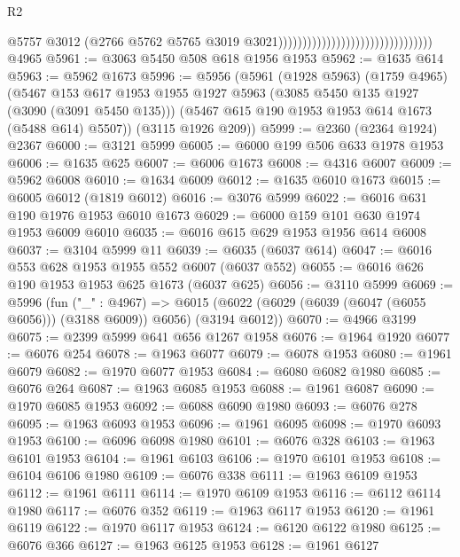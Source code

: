 \begin{lexlean}{R2}
\begin{coremodule}
                                                                  @5757
                                                                  @3012
                                                                  (@2766
                                                                    @5762
                                                                    @5765
                                                                    @3019
                                                                    @3021))))))))))))))))))))))))))))))))
    @4965
@5961 := @3063 @5450 @508 @618 @1956 @1953
@5962 := @1635 @614
@5963 := @5962 @1673
@5996 := @5956
    (@5961
      (@1928 @5963)
      (@1759 @4965)
      (@5467
        @153
        @617
        @1953
        @1955
        @1927
        @5963
        (@3085 @5450 @135 @1927 (@3090 (@3091 @5450 @135)))
        (@5467 @615 @190 @1953 @1953 @614 @1673 (@5488 @614) @5507))
      (@3115 @1926 @209))
@5999 := @2360 (@2364 @1924) @2367
@6000 := @3121 @5999
@6005 := @6000 @199 @506 @633 @1978 @1953
@6006 := @1635 @625
@6007 := @6006 @1673
@6008 := @4316 @6007
@6009 := @5962 @6008
@6010 := @1634 @6009
@6012 := @1635 @6010 @1673
@6015 := @6005 @6012 (@1819 @6012)
@6016 := @3076 @5999
@6022 := @6016 @631 @190 @1976 @1953 @6010 @1673
@6029 := @6000 @159 @101 @630 @1974 @1953 @6009 @6010
@6035 := @6016 @615 @629 @1953 @1956 @614 @6008
@6037 := @3104 @5999 @11
@6039 := @6035 (@6037 @614)
@6047 := @6016 @553 @628 @1953 @1955 @552 @6007 (@6037 @552)
@6055 := @6016 @626 @190 @1953 @1953 @625 @1673 (@6037 @625)
@6056 := @3110 @5999
@6069 := @5996
    (fun ("_" : @4967) =>
    @6015 (@6022 (@6029 (@6039 (@6047 (@6055 @6056))) (@3188 @6009)) @6056) (@3194 @6012))
@6070 := @4966 @3199
@6075 := @2399 @5999 @641 @656 @1267 @1958
@6076 := @1964 @1920
@6077 := @6076 @254
@6078 := @1963 @6077
@6079 := @6078 @1953
@6080 := @1961 @6079
@6082 := @1970 @6077 @1953
@6084 := @6080 @6082 @1980
@6085 := @6076 @264
@6087 := @1963 @6085 @1953
@6088 := @1961 @6087
@6090 := @1970 @6085 @1953
@6092 := @6088 @6090 @1980
@6093 := @6076 @278
@6095 := @1963 @6093 @1953
@6096 := @1961 @6095
@6098 := @1970 @6093 @1953
@6100 := @6096 @6098 @1980
@6101 := @6076 @328
@6103 := @1963 @6101 @1953
@6104 := @1961 @6103
@6106 := @1970 @6101 @1953
@6108 := @6104 @6106 @1980
@6109 := @6076 @338
@6111 := @1963 @6109 @1953
@6112 := @1961 @6111
@6114 := @1970 @6109 @1953
@6116 := @6112 @6114 @1980
@6117 := @6076 @352
@6119 := @1963 @6117 @1953
@6120 := @1961 @6119
@6122 := @1970 @6117 @1953
@6124 := @6120 @6122 @1980
@6125 := @6076 @366
@6127 := @1963 @6125 @1953
@6128 := @1961 @6127

\end{coremodule}
\end{lexlean}
